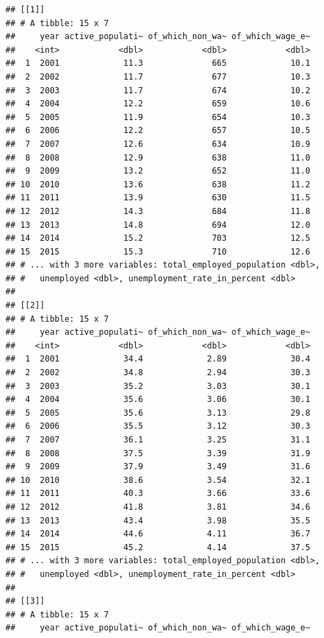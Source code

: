 \documentclass[]{gitbook}
\theoremstyle{definition}
\theoremstyle{definition}
\theoremstyle{definition}
\theoremstyle{remark}
\begin{document}
\begin{verbatim}
## [[1]]
## # A tibble: 15 x 7
##     year active_populati~ of_which_non_wa~ of_which_wage_e~
##    <int>            <dbl>            <dbl>            <dbl>
##  1  2001             11.3              665             10.1
##  2  2002             11.7              677             10.3
##  3  2003             11.7              674             10.2
##  4  2004             12.2              659             10.6
##  5  2005             11.9              654             10.3
##  6  2006             12.2              657             10.5
##  7  2007             12.6              634             10.9
##  8  2008             12.9              638             11.0
##  9  2009             13.2              652             11.0
## 10  2010             13.6              638             11.2
## 11  2011             13.9              630             11.5
## 12  2012             14.3              684             11.8
## 13  2013             14.8              694             12.0
## 14  2014             15.2              703             12.5
## 15  2015             15.3              710             12.6
## # ... with 3 more variables: total_employed_population <dbl>,
## #   unemployed <dbl>, unemployment_rate_in_percent <dbl>
## 
## [[2]]
## # A tibble: 15 x 7
##     year active_populati~ of_which_non_wa~ of_which_wage_e~
##    <int>            <dbl>            <dbl>            <dbl>
##  1  2001             34.4             2.89             30.4
##  2  2002             34.8             2.94             30.3
##  3  2003             35.2             3.03             30.1
##  4  2004             35.6             3.06             30.1
##  5  2005             35.6             3.13             29.8
##  6  2006             35.5             3.12             30.3
##  7  2007             36.1             3.25             31.1
##  8  2008             37.5             3.39             31.9
##  9  2009             37.9             3.49             31.6
## 10  2010             38.6             3.54             32.1
## 11  2011             40.3             3.66             33.6
## 12  2012             41.8             3.81             34.6
## 13  2013             43.4             3.98             35.5
## 14  2014             44.6             4.11             36.7
## 15  2015             45.2             4.14             37.5
## # ... with 3 more variables: total_employed_population <dbl>,
## #   unemployed <dbl>, unemployment_rate_in_percent <dbl>
## 
## [[3]]
## # A tibble: 15 x 7
##     year active_populati~ of_which_non_wa~ of_which_wage_e~

\end{verbatim}
\end{document}

